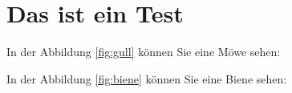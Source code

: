\Blinddocument

\chapter{Das ist ein Test}

In der Abbildung \ref{fig:gull} können Sie eine Möwe sehen:

In der Abbildung \ref{fig:biene} können Sie eine Biene sehen:
\Blinddocument
